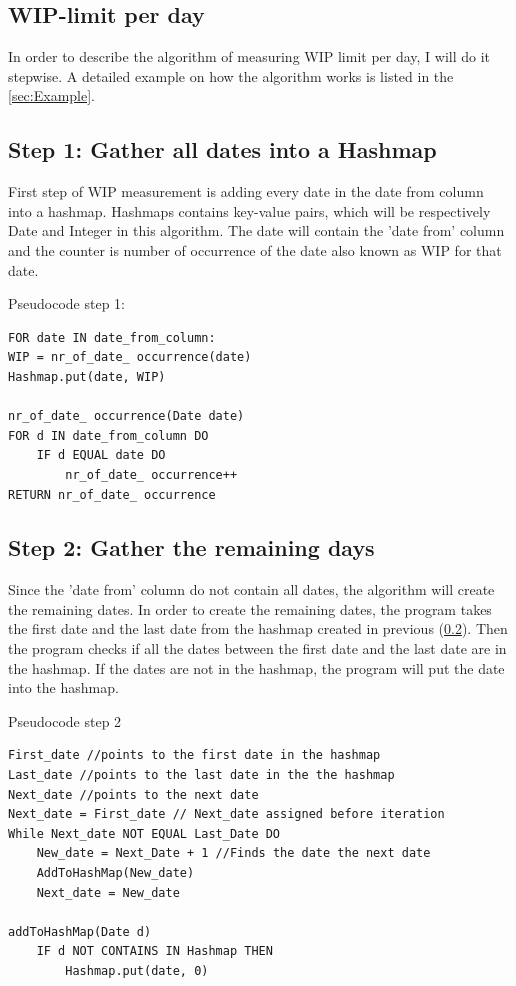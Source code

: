 \documentclass[UKenglish]{ifimaster}  %
\begin{document}
\subsection {WIP-limit per day}
In order to describe the algorithm of measuring WIP limit per day, I will do it stepwise.  A detailed example on how the algorithm works is listed in the \ref{sec:Example}.

\subsection{Step 1: Gather all dates into a Hashmap}
\label{sub:stepOne}
First step of WIP measurement is adding every date in the date from column into a hashmap. Hashmaps contains key-value pairs, which will be respectively Date and Integer in this algorithm.  The date will contain the 'date from' column and the counter is number of occurrence of the date also known as WIP for that date. 

Pseudocode step 1:
 \begin{lstlisting}
FOR date IN date_from_column:
WIP = nr_of_date_ occurrence(date)
Hashmap.put(date, WIP)

nr_of_date_ occurrence(Date date) 
FOR d IN date_from_column DO
	IF d EQUAL date DO
		nr_of_date_ occurrence++
RETURN nr_of_date_ occurrence
 \end{lstlisting}
\subsection{Step 2: Gather the remaining days}
 \label{sub:stepTwo}
Since the 'date from' column do not contain all dates, the algorithm will create the remaining dates.  
In order to create the remaining dates, the program takes the first date and the last date from the hashmap created in previous (\ref{sub:stepOne}). Then the program checks if all the dates between the first date and the last date are in the hashmap. If the dates are not in the hashmap, the program will put the date into the hashmap.

Pseudocode step 2
 \begin{lstlisting}
First_date //points to the first date in the hashmap 
Last_date //points to the last date in the the hashmap 
Next_date //points to the next date
Next_date = First_date // Next_date assigned before iteration
While Next_date NOT EQUAL Last_Date DO
	New_date = Next_Date + 1 //Finds the date the next date
	AddToHashMap(New_date)
	Next_date = New_date

addToHashMap(Date d)
	IF d NOT CONTAINS IN Hashmap THEN
		Hashmap.put(date, 0) 
 \end{lstlisting}
\end{document}
